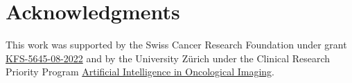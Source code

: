 \documentclass[twocolumn]{aastex631}
\begin{document}
\section{Acknowledgments}

This work was supported by the Swiss Cancer Research Foundation under grant \href{https://www.krebsforschung.ch/unterstuetzen-sie-uns/stiftungen/-dl-/fileadmin/downloads/unterstuetzen-sie-uns/projekte-der-stiftung-krebsforschung-schweiz-2023.pdf}{KFS-5645-08-2022} and by the University Zürich under the Clinical Research Priority Program \href{https://www.crpp-ai-oncology.uzh.ch/en/Projects/Project-5.html}{Artificial Intelligence in Oncological Imaging}.


\end{document}
